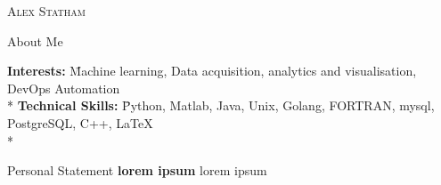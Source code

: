 \documentclass[a4paper]{article}
\newlength{\tabin}
\newlength{\secsep}
\newcommand{\lineunder}{\vspace*{-8pt} \\ \hspace*{-6pt} \hrulefill \\ \vspace*{-15pt}}
\newcommand{\name}[1]{\begin{center}\textsc{\Huge#1}\\\end{center}}
\newcommand{\contact}[1]{\begin{center}\color{contactgray}{\small#1}\end{center}}
\newenvironment{tabbedsection}[1]{
  \begin{list}{}{
      \setlength{\itemsep}{0pt}
      \setlength{\labelsep}{0pt}
      \setlength{\labelwidth}{0pt}
      \setlength{\leftmargin}{\tabin}
      \setlength{\rightmargin}{\tabin}
      \setlength{\listparindent}{0pt}
      \setlength{\parsep}{0pt}
      \setlength{\parskip}{0pt}
      \setlength{\partopsep}{0pt}
      \setlength{\topsep}{#1}
    }
  \item[]
}{\end{list}}
\newenvironment{nospacetabbing}{
    \begin{tabbing}
}{\end{tabbing}\vspace{-1.2em}}
\newenvironment{resume_header}{}{\vspace{0pt}}
\newenvironment{resume_section}[1]{
  \filbreak
  \vspace{2\secsep}
  \textsc{\large#1}
  \lineunder
  \begin{tabbedsection}{\secsep}
}{\end{tabbedsection}}
\begin{document}
\begin{resume_header}
\name{Alex Statham}
\contact{alex.staham1998@gmail.com  $\bullet$ +447490973388 $\bullet$ astatham.com}
\end{resume_header}

\begin{resume_section}{About Me}
  \begin{nospacetabbing}
  \textbf{Interests:}  \= Machine learning,  Data acquisition, analytics and visualisation, DevOps Automation \\*
  \textbf{Technical Skills:}  \= Python, Matlab, Java, Unix, Golang, FORTRAN, mysql, PostgreSQL, C++,  \LaTeX\\*
  \end{nospacetabbing}
\end{resume_section}

\begin{resume_section}{Personal Statement}
  \textbf{lorem ipsum} lorem ipsum
\end{resume_section}
\end{document}
